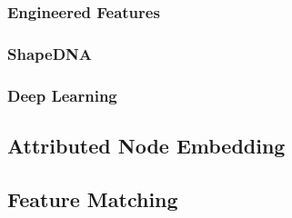 \documentclass{article}
\begin{document}
\subsubsection{Engineered Features}
\subsubsection{ShapeDNA}
\subsubsection{Deep Learning}

\subsection{Attributed Node Embedding}
\subsection{Feature Matching}
\end{document}
